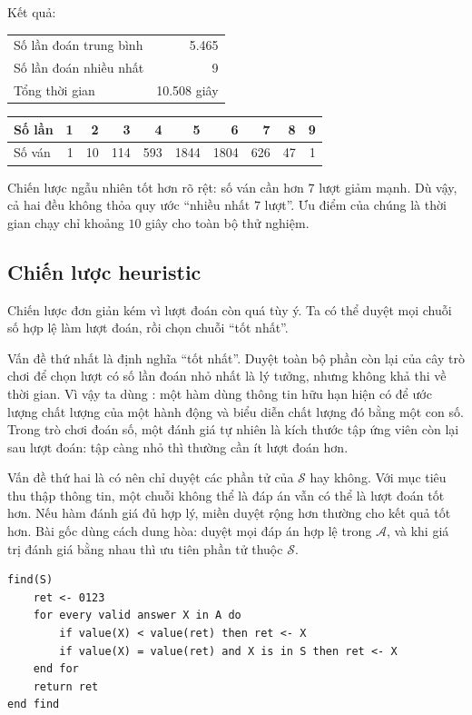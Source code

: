 \documentclass[11pt]{article}
\newcommand{\SetS}{\mathcal{S}}
\newcommand{\Ans}{\mathcal{A}}
\begin{document}
Kết quả:
\begin{center}
\small
\begin{tabular}{|l|r|}
\hline
Số lần đoán trung bình & 5.465 \\
Số lần đoán nhiều nhất & 9 \\
Tổng thời gian & 10.508 giây \\
\hline
\end{tabular}

\medskip
\begin{tabular}{|l|rrrrrrrrr|}
\hline
Số lần & 1 & 2 & 3 & 4 & 5 & 6 & 7 & 8 & 9 \\
\hline
Số ván & 1 & 10 & 114 & 593 & 1844 & 1804 & 626 & 47 & 1 \\
\hline
\end{tabular}
\end{center}

Chiến lược ngẫu nhiên tốt hơn rõ rệt: số ván cần hơn \(7\) lượt giảm mạnh.
Dù vậy, cả hai đều không thỏa quy ước ``nhiều nhất \(7\) lượt''. Ưu điểm của
chúng là thời gian chạy chỉ khoảng \(10\) giây cho toàn bộ thử nghiệm.

\subsection{Chiến lược heuristic}

Chiến lược đơn giản kém vì lượt đoán còn quá tùy ý. Ta có thể duyệt mọi chuỗi
số hợp lệ làm lượt đoán, rồi chọn chuỗi ``tốt nhất''.

Vấn đề thứ nhất là định nghĩa ``tốt nhất''. Duyệt toàn bộ phần còn lại của cây
trò chơi để chọn lượt có số lần đoán nhỏ nhất là lý tưởng, nhưng không khả thi
về thời gian. Vì vậy ta dùng : một hàm dùng thông tin hữu
hạn hiện có để ước lượng chất lượng của một hành động và biểu diễn chất lượng
đó bằng một con số. Trong trò chơi đoán số, một đánh giá tự nhiên là kích
thước tập ứng viên còn lại sau lượt đoán: tập càng nhỏ thì thường cần ít lượt
đoán hơn.

Vấn đề thứ hai là có nên chỉ duyệt các phần tử của \(\SetS\) hay không. Với
mục tiêu thu thập thông tin, một chuỗi không thể là đáp án vẫn có thể là lượt
đoán tốt hơn. Nếu hàm đánh giá đủ hợp lý, miền duyệt rộng hơn thường cho kết
quả tốt hơn. Bài gốc dùng cách dung hòa: duyệt mọi đáp án hợp lệ trong
\(\Ans\), và khi giá trị đánh giá bằng nhau thì ưu tiên phần tử thuộc
\(\SetS\).

\begin{verbatim}
find(S)
    ret <- 0123
    for every valid answer X in A do
        if value(X) < value(ret) then ret <- X
        if value(X) = value(ret) and X is in S then ret <- X
    end for
    return ret
end find
\end{verbatim}
\end{document}
